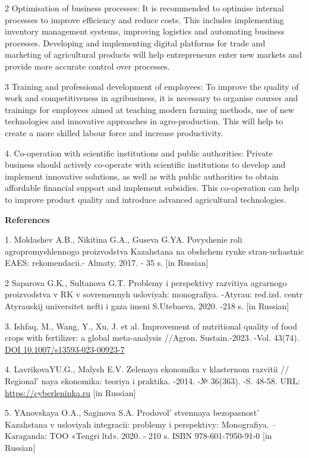 \begin{multicols}{2}
2 Optimisation of business processes: It is recommended to optimise
internal processes to improve efficiency and reduce costs. This includes
implementing inventory management systems, improving logistics and
automating business processes. Developing and implementing digital
platforms for trade and marketing of agricultural products will help
entrepreneurs enter new markets and provide more accurate control over
processes.

3 Training and professional development of employees: To improve the
quality of work and competitiveness in agribusiness, it is necessary to
organise courses and trainings for employees aimed at teaching modern
farming methods, use of new technologies and innovative approaches in
agro-production. This will help to create a more skilled labour force
and increase productivity.

4. Co-operation with scientific institutions and public authorities:
Private business should actively co-operate with scientific institutions
to develop and implement innovative solutions, as well as with public
authorities to obtain affordable financial support and implement
subsidies. This co-operation can help to improve product quality and
introduce advanced agricultural technologies.
\end{multicols}


{\bfseries References}

1. Moldashev A.B., Nikitina G.A., Guseva G.YA. Povyshenie roli
agropromyshlennogo proizvodstva Kazahstana na obshchem rynke
stran-uchastnic EAES: rekomendacii.- Almaty, 2017. - 35 s. {[}in
Russian{]}

2 Saparova G.K., Sultanova G.T. Problemy i perspektivy razvitiya
agrarnogo proizvodstva v RK v sovremennyh usloviyah: monografiya.
-Atyrau: red.izd. centr Atyrauskij universitet nefti i gaza imeni
S.Utebaeva, 2020. -218 s. {[}in Russian{]}

3. Ishfaq, M., Wang, Y., Xu, J. et al. Improvement of nutritional
quality of food crops with fertilizer: a global meta-analysis //Agron.
Sustain.-2023. -Vol. 43(74).
\href{https://doi.org/10.1007/s13593-023-00923-7}{DOI
10.1007/s13593-023-00923-7}

4. LavrikovaYU.G., Malysh E.V. Zelenaya ekonomika v klasternom razvitii
// Regional' naya ekonomika: teoriya i praktika. -2014.
-№ 36(363). -S. 48-58.
URL:
\href{https://cyberleninka.ru/article/n/zelenaya-ekonomika-v-klasternom-razvitii}{https://cyberleninka.ru}
{[}in Russian{]}

5. YAnovskaya O.A., Saginova S.A. Prodovol' stvennaya
bezopasnost' Kazahstana v usloviyah integracii: problemy i perspektivy:
Monografiya. -- Karaganda: TOO «Tengri ltd». 2020. - 210 s. ISBN
978-601-7950-91-0 {[}in Russian{]}

